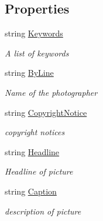 \subsection*{Properties}
\begin{DoxyCompactItemize}
\item 
string \mbox{\hyperlink{class_pic_d_b_1_1_models_1_1_i_p_t_c_model_a60958a1ca8c9800f6499aaddd73ac5e6}{Keywords}}
\begin{DoxyCompactList}\small\item\em A list of keywords \end{DoxyCompactList}\item 
string \mbox{\hyperlink{class_pic_d_b_1_1_models_1_1_i_p_t_c_model_a5c73683dbe7b1c2d95057b97f1596e25}{By\+Line}}
\begin{DoxyCompactList}\small\item\em Name of the photographer \end{DoxyCompactList}\item 
string \mbox{\hyperlink{class_pic_d_b_1_1_models_1_1_i_p_t_c_model_a74f5bbf0072f3f259d516e5b93d55813}{Copyright\+Notice}}
\begin{DoxyCompactList}\small\item\em copyright notices \end{DoxyCompactList}\item 
string \mbox{\hyperlink{class_pic_d_b_1_1_models_1_1_i_p_t_c_model_a5294f413c85e8d93ae28471ba66083f3}{Headline}}
\begin{DoxyCompactList}\small\item\em Headline of picture \end{DoxyCompactList}\item 
string \mbox{\hyperlink{class_pic_d_b_1_1_models_1_1_i_p_t_c_model_a7dd9a33da934151380170190496b4bf1}{Caption}}
\begin{DoxyCompactList}\small\item\em description of picture \end{DoxyCompactList}\end{DoxyCompactItemize}


